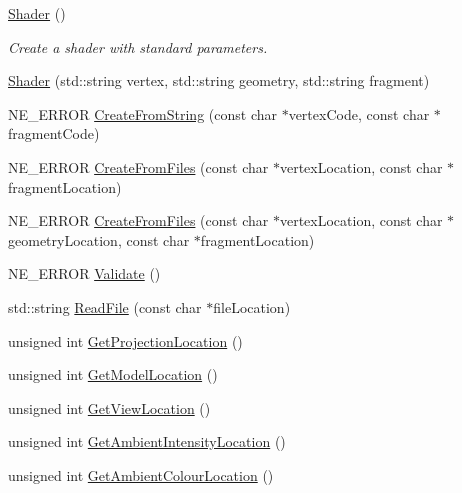 \begin{DoxyCompactItemize}
\item 
\mbox{\label{class_shader_a0d654ebaca4e0555197c0724c6d30610}} 
\mbox{\hyperlink{class_shader_a0d654ebaca4e0555197c0724c6d30610}{Shader}} ()
\begin{DoxyCompactList}\small\item\em Create a shader with standard parameters. \end{DoxyCompactList}\item 
\mbox{\hyperlink{class_shader_ae816251b4688f0aada3afbdd6e232b63}{Shader}} (std\+::string vertex, std\+::string geometry, std\+::string fragment)
\item 
N\+E\+\_\+\+E\+R\+R\+OR \mbox{\hyperlink{class_shader_a099eeffb7a893ab69cc34b70faed9d3b}{Create\+From\+String}} (const char $\ast$vertex\+Code, const char $\ast$fragment\+Code)
\item 
N\+E\+\_\+\+E\+R\+R\+OR \mbox{\hyperlink{class_shader_aeca0f4f24d2d7e2ac5fda22bca6e21c5}{Create\+From\+Files}} (const char $\ast$vertex\+Location, const char $\ast$fragment\+Location)
\item 
N\+E\+\_\+\+E\+R\+R\+OR \mbox{\hyperlink{class_shader_a8acc385e9b2afc97833343472d237d10}{Create\+From\+Files}} (const char $\ast$vertex\+Location, const char $\ast$geometry\+Location, const char $\ast$fragment\+Location)
\item 
N\+E\+\_\+\+E\+R\+R\+OR \mbox{\hyperlink{class_shader_a7cee617233ae421013677cf8a73474fd}{Validate}} ()
\item 
std\+::string \mbox{\hyperlink{class_shader_acca9db816d6d9587bef5689317aea69e}{Read\+File}} (const char $\ast$file\+Location)
\item 
unsigned int \mbox{\hyperlink{class_shader_a72552e2fc926a863026bd008aa91983e}{Get\+Projection\+Location}} ()
\item 
unsigned int \mbox{\hyperlink{class_shader_af5f8544bb3019444d39bb3d6630609cf}{Get\+Model\+Location}} ()
\item 
unsigned int \mbox{\hyperlink{class_shader_a8950f9df8d8fd0357c129e1dca74be24}{Get\+View\+Location}} ()
\item 
unsigned int \mbox{\hyperlink{class_shader_a1a45ad641d9850ad398ae3ec905ffc8d}{Get\+Ambient\+Intensity\+Location}} ()
\item 
unsigned int \mbox{\hyperlink{class_shader_aa5cbc6c601afb278fe112ae2c46384b0}{Get\+Ambient\+Colour\+Location}} ()
\item 

\end{DoxyCompactItemize}
